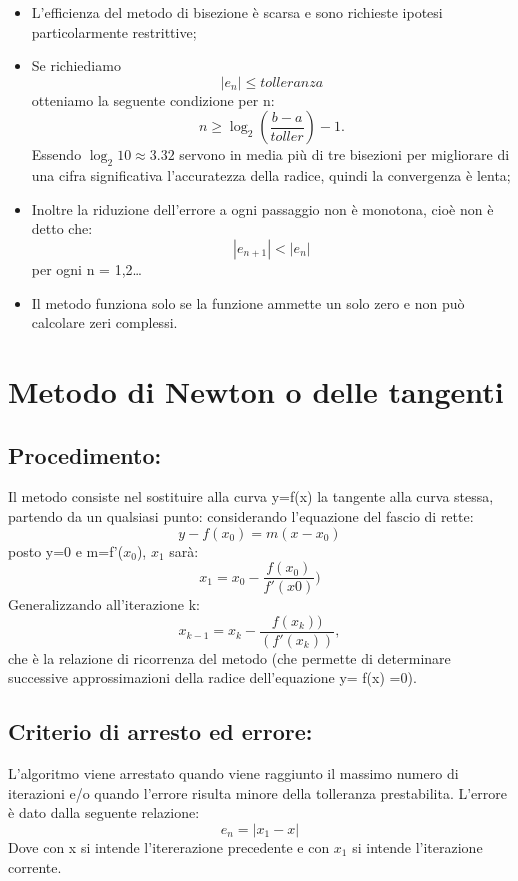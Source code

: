 \documentclass[a4paper,12pt,]{article}
\begin{document}
\begin {itemize}
\item L'efficienza del metodo di bisezione è scarsa e sono richieste ipotesi particolarmente restrittive;
\item Se richiediamo \begin {equation}|e_n| \le tolleranza  \end {equation}otteniamo la seguente condizione per n:
\begin{equation}	n \ge \log_2 (\frac{b-a} {toller}) - 1. \end{equation}
Essendo $ \log_2 10 \approx 3.32$
servono in media più di tre bisezioni per migliorare di una cifra significativa l'accuratezza della radice, quindi la convergenza è  lenta;
\item Inoltre la riduzione dell'errore a ogni passaggio non è monotona, cioè non è detto che:  \begin {equation}|e_{n+1}| < |e_n | \end{equation}per ogni n = 1,2\dots
\item Il metodo funziona solo se la funzione ammette un solo zero e non può calcolare zeri complessi.
\end{itemize}
\section {Metodo di Newton o delle tangenti}		
\subsection{Procedimento:}
Il metodo consiste nel sostituire alla curva  y=f(x)  la tangente alla curva stessa, partendo da un qualsiasi punto: considerando l’equazione del fascio di rette:
\begin{equation} y - f(x_0)=m(x-x_0)\end{equation} posto y=0 e m=f'($x_0$), $x_1$ sarà:\begin{equation} x_1=x_0-\frac {f(x_0)}{f'(x0)}) \end{equation}
Generalizzando all’iterazione k:  \begin {equation} x_{k-1} =x_k- \frac {f(x_k))}{(f'(x_k))}, \end {equation} che è la relazione di ricorrenza del metodo (che permette di determinare successive 	
approssimazioni della radice dell'equazione y= f(x) =0).
\subsection{Criterio di arresto ed errore:}
L'algoritmo viene arrestato quando viene raggiunto il massimo numero di iterazioni e/o quando l'errore risulta minore della tolleranza prestabilita.
L'errore è dato dalla seguente relazione:
\begin{equation} e_n=|x_1-x| \end{equation}
Dove con x si intende l'itererazione precedente e con $x_1$ si intende l'iterazione corrente.
\end{document}
